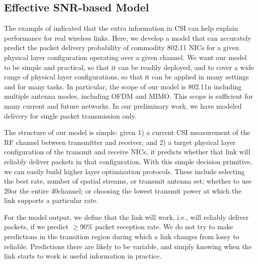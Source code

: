 \subsection{Effective SNR-based Model}
The example of  indicated that the extra information in CSI can help explain performance for real wireless links. Here, we develop a model that can accurately predict the packet delivery probability of commodity 802.11 NICs for a given physical layer configuration operating over a given channel. We want our model to be simple and practical, so that it can be readily deployed, and to cover a wide range of physical layer configurations, so that it can be applied in many settings and for many tasks. In particular, the scope of our model is 802.11n including multiple antenna modes, including OFDM and MIMO\@. This scope is sufficient for many current and future networks. In our preliminary work, we have modeled delivery for single packet transmission only.

The structure of our model is simple: given 1) a current CSI measurement of the RF channel between transmitter and receiver, and 2) a target physical layer configuration of the transmit and receive NICs, it predicts whether that link will reliably deliver packets in that configuration.
With this simple decision primitive, we can easily build higher layer optimization protocols. These include selecting the best rate, number of spatial streams, or transmit antenna set; whether to use 20\MHz or the entire 40\MHz channel; or choosing the lowest transmit power at which the link supports a particular rate.

For the model output, we define that the link will work, i.e., will reliably deliver packets, if we predict $\geq$90\% packet reception rate. We do not try to make predictions in the transition region during which a link changes from lossy to reliable. Predictions there are likely to be variable, and simply knowing when the link starts to work is useful information in practice.

\ifx\mainfile\undefined

\fi
